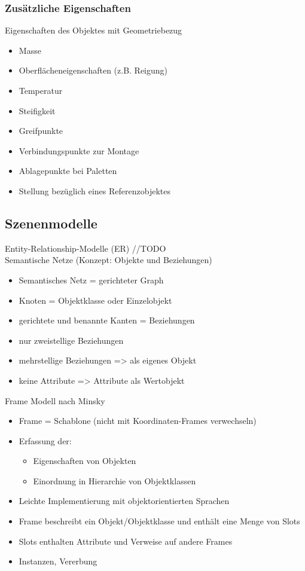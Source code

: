 \documentclass[paper=a4, fontsize=11pt]{scrartcl} %
\numberwithin{equation}{section} %
\numberwithin{figure}{section} %
\numberwithin{table}{section} %
\begin{document}
\subsubsection{Zusätzliche Eigenschaften}

Eigenschaften des Objektes mit Geometriebezug
\begin{itemize}
\item Masse
\item Oberflächeneigenschaften (z.B. Reigung)
\item Temperatur
\item Steifigkeit
\item Greifpunkte
\item Verbindungspunkte zur Montage
\item Ablagepunkte bei Paletten
\item Stellung bezüglich eines Referenzobjektes
\end{itemize}

\subsection{Szenenmodelle}

Entity-Relationship-Modelle (ER) //TODO \\

Semantische Netze (Konzept: Objekte und Beziehungen)
\begin{itemize}
\item Semantisches Netz = gerichteter Graph
\item Knoten = Objektklasse oder Einzelobjekt
\item gerichtete und benannte Kanten = Beziehungen
\item nur zweistellige Beziehungen
\item mehrstellige Beziehungen => als eigenes Objekt
\item keine Attribute => Attribute als Wertobjekt
\end{itemize}

Frame Modell nach Minsky
\begin{itemize}
\item Frame = Schablone (nicht mit Koordinaten-Frames verwechseln)
\item Erfassung der:
\begin{itemize}
\item Eigenschaften von Objekten
\item Einordnung in Hierarchie von Objektklassen
\end{itemize}
\item Leichte Implementierung mit objektorientierten Sprachen
\item Frame beschreibt ein Objekt/Objektklasse und enthält eine Menge von Slots
\item Slots enthalten Attribute und Verweise auf andere Frames
\item Instanzen, Vererbung
\end{itemize}
\end{document}
